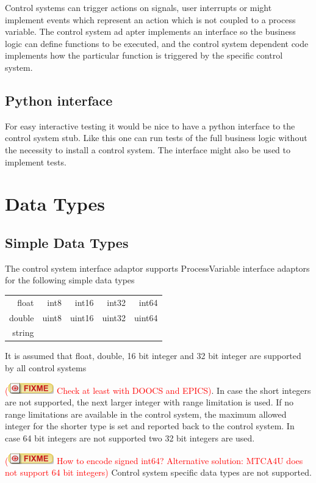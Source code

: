 \documentclass[11pt,a4paper]{scrartcl}
\newcounter{nFixmes}
\newcommand{\fixme}[1]{\addtocounter{nFixmes}{1}\textcolor{red}{(\includegraphics[height=2ex]{fixme} #1)}\xspace}
\begin{document}
Control systems can trigger actions on signals, user interrupts or might implement events which represent an action which is not coupled to a process variable. The control system ad apter implements an interface so the business logic can define functions to be executed, and the control system dependent code implements how the particular function is triggered by the specific control system.

\subsection{Python interface}

For easy interactive testing it would be nice to have a python interface to the control system stub. Like this one can run tests of the full business logic without the necessity to install a control system. The interface might also be used to implement tests.

\section{Data Types}

\subsection{Simple Data Types}

The control system interface adaptor supports ProcessVariable interface adaptors for the following simple data types\\[2ex]
\begin{tabular}{rrrrr}
float & int8 & int16 & int32 & int64\\
double & uint8 & uint16 & uint32 & uint64 \\
string\\[2ex]
\end{tabular}

It is assumed that float, double, 16 bit integer and 32 bit integer are supported by all control systems \fixme{Check at least with DOOCS and EPICS}. In case the short integers are not supported, the next larger integer with range limitation is used. If no range limitations are available in the control system, the maximum allowed integer for the shorter type is set and reported back to the control system. In case 64 bit integers are not supported two 32 bit integers are used. \fixme{How to encode signed int64? Alternative solution: MTCA4U does not support 64 bit integers}
Control system specific data types are not supported.
\end{document}
